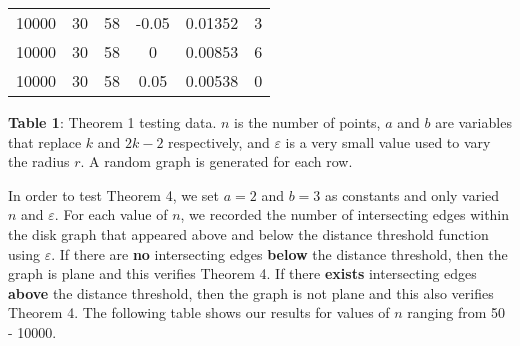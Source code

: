 \documentclass{article}
\begin{document}
\begin{center}
\begin{longtable}{ | c | c | c | c | c | L | }
10000 & 30 & 58 & -0.05 & 0.01352 & 3 \\
10000 & 30 & 58 & 0 & 0.00853 & 6 \\
10000 & 30 & 58 & 0.05 & 0.00538 & 0 \\

\hline
\end{longtable}
\begin{small}
\textbf{Table 1}: Theorem 1 testing data. $n$ is the number of points, $a$ and $b$ are variables that replace $k$ and $2k-2$ respectively, and $\varepsilon$ is a very small value used to vary the radius $r$. A random graph is generated for each row.
\end{small}
\end{center}

\newpage
In order to test Theorem 4, we set $a=2$ and $b=3$ as constants and only varied $n$ and $\varepsilon$. For each value of $n$, we recorded the number of intersecting edges within the disk graph that appeared above and below the distance threshold function using $\varepsilon$. If there are \textbf{no} intersecting edges \textbf{below} the distance threshold, then the graph is plane and this verifies Theorem 4. If there \textbf{exists} intersecting edges \textbf{above} the distance threshold, then the graph is not plane and this also verifies Theorem 4. The following table shows our results for values of $n$ ranging from 50 - 10000.
\end{document}
